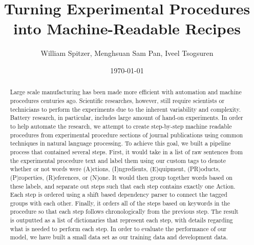 \usepackage{chapterbib}    %
\usepackage{color}         %
\usepackage{graphics}      %
\usepackage[pdftex]{graphicx}      %
\usepackage{longtable}     %
\usepackage{epsf}          %
\usepackage{bm}            %
\usepackage{thumbpdf}
\usepackage[colorlinks=true]{hyperref}  %

\renewcommand\[{\begin{equation}}
\renewcommand\]{\end{equation}}

\newcommand{\beq}{\begin{equation}}
\newcommand{\eeq}{\end{equation}}

%
%


\title{Turning Experimental Procedures into Machine-Readable Recipes}
\author         {William Spitzer, Menghsuan Sam Pan, Iveel Tsogsuren}
\date{\today}

\begin{abstract}
Large scale manufacturing has been made more efficient with automation and machine procedures centuries ago. Scientific researches, however, still require scientists or technicians to perform the experiments due to the inherent variability and complexity. Battery research, in particular, includes large amount of hand-on experiments. In order to help automate the research, we attempt to create step-by-step machine readable procedures from experimental procedure sections of journal publications using common techniques in natural language processing. To achieve this goal, we built a pipeline process that contained several steps. First, it would take in a list of raw sentences from the experimental procedure text and label them using our custom tags to denote whether or not words were (A)ctions, (I)ngredients, (E)quipment, (PR)oducts, (P)roperties, (R)eferences, or (N)one. It would then group together words based on these labels, and separate out steps such that each step contains exactly one Action. Each step is ordered using a shift based dependency parser to connect the tagged groups with each other. Finally, it orders all of the steps based on keywords in the procedure so that each step follows chronologically from the previous step. The result is outputted as a list of dictionaries that represent each step, with details regarding what is needed to perform each step. In order to evaluate the performance of our model, we have built a small data set as our training data and development data. 
\end{abstract}

